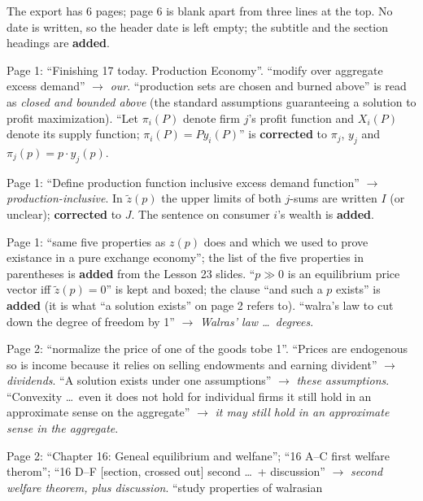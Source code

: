 \documentclass[11pt]{article}
\begin{document}
\begin{transcriptnotes}
  \item The export has 6 pages; page 6 is blank apart from three lines at the top. No date
        is written, so the header date is left empty; the subtitle and the section headings
        are \textbf{added}.
  \item Page 1: ``Finishing 17 today. Production Economy''. ``modify over aggregate excess
        demand'' $\to$ \emph{our}. ``production sets are chosen and burned above'' is
        read as \emph{closed and bounded above} (the standard assumptions guaranteeing a
        solution to profit maximization). ``Let $\pi_i(P)$ denote firm $j$'s profit function
        and $X_i(P)$ denote its supply function; $\pi_i(P)=Py_i(P)$'' is \textbf{corrected}
        to $\pi_j$, $y_j$ and $\pi_j(p)=p\cdot y_j(p)$.
  \item Page 1: ``Define production function inclusive excess demand function'' $\to$
        \emph{production-inclusive}. In $\tilde z(p)$ the upper limits of both $j$-sums
        are written $I$ (or unclear); \textbf{corrected} to $J$. The sentence on
        consumer $i$'s wealth is \textbf{added}.
  \item Page 1: ``same five properties as $z(p)$ does and which we used to prove existance
        in a pure exchange economy''; the list of the five properties in parentheses is
        \textbf{added} from the Lesson 23 slides. ``$p\gg0$ is an equilibrium price vector
        iff $\tilde z(p)=0$'' is kept and boxed; the clause ``and such a $p$ exists'' is
        \textbf{added} (it is what ``a solution exists'' on page 2 refers to). ``walra's law
        to cut down the degree of freedom by 1'' $\to$ \emph{Walras' law \dots\ degrees}.
  \item Page 2: ``normalize the price of one of the goods tobe 1''. ``Prices are endogenous
        so is income because it relies on selling endowments and earning divident'' $\to$
        \emph{dividends}. ``A solution exists under one assumptions'' $\to$ \emph{these
        assumptions}. ``Convexity \dots\ even it does not hold for individual firms it still
        hold in an approximate sense on the aggregate'' $\to$ \emph{it may still hold in an
        approximate sense in the aggregate}.
  \item Page 2: ``Chapter 16: Geneal equilibrium and welfane''; ``16 A--C first welfare
        therom''; ``16 D--F [section, crossed out] second \dots\ + discussion'' $\to$
        \emph{second welfare theorem, plus discussion}. ``study properties of walrasian

\end{transcriptnotes}
\end{document}
